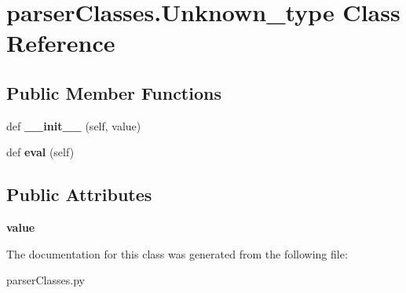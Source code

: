 \hypertarget{classparser_classes_1_1_unknown__type}{}\section{parser\+Classes.\+Unknown\+\_\+type Class Reference}
\label{classparser_classes_1_1_unknown__type}
\subsection*{Public Member Functions}
\begin{DoxyCompactItemize}
\item 
def {\bfseries \+\_\+\+\_\+init\+\_\+\+\_\+} (self, value)\hypertarget{classparser_classes_1_1_unknown__type_a9562f0bab5ec63025079c370fc164f81}{}\label{classparser_classes_1_1_unknown__type_a9562f0bab5ec63025079c370fc164f81}

\item 
def {\bfseries eval} (self)\hypertarget{classparser_classes_1_1_unknown__type_a28e421b5d0e2a0f7fcf34dae75ac51b4}{}\label{classparser_classes_1_1_unknown__type_a28e421b5d0e2a0f7fcf34dae75ac51b4}

\end{DoxyCompactItemize}
\subsection*{Public Attributes}
\begin{DoxyCompactItemize}
\item 
{\bfseries value}\hypertarget{classparser_classes_1_1_unknown__type_a35589b9171b9277aa83a08ca38c10938}{}\label{classparser_classes_1_1_unknown__type_a35589b9171b9277aa83a08ca38c10938}

\end{DoxyCompactItemize}


The documentation for this class was generated from the following file\+:\begin{DoxyCompactItemize}
\item 
parser\+Classes.\+py\end{DoxyCompactItemize}
